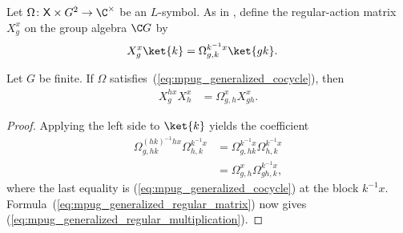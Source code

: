 \begin{definition}
    \label{def:mpug_generalized_regular_matrices}
    \leanok
    Let $\Omega\colon\mathsf X\times G^2\to\C^\times$ be an $L$-symbol.
    As in \cite[Lemma~\texttt{lemma:G\_cocycle}]{FrancoRubio2025MPUGauging},
    define the regular-action matrix $X^x_g$ on the group algebra $\C G$ by
    \begin{align}
        X^x_g\ket{k}
         & =\Omega^{k^{-1}x}_{g,k}\ket{gk}.
        \label{eq:mpug_generalized_regular_matrix}
    \end{align}
\end{definition}

\begin{lemma}
    \label{thm:mpug_generalized_regular_multiplication}
    \leanok
    Let $G$ be finite. If $\Omega$
    satisfies~(\ref{eq:mpug_generalized_cocycle}), then
    \begin{align}
        X^{h x}_gX^x_h
         & =\Omega^x_{g,h}X^x_{gh}.
        \label{eq:mpug_generalized_regular_multiplication}
    \end{align}
\end{lemma}

\begin{proof}\leanok
    Applying the left side to $\ket{k}$ yields the coefficient
    \begin{align}
        \Omega^{(hk)^{-1}h x}_{g,hk}\Omega^{k^{-1}x}_{h,k}
         & =\Omega^{k^{-1}x}_{g,hk}\Omega^{k^{-1}x}_{h,k} \\
         & =\Omega^x_{g,h}\Omega^{k^{-1}x}_{gh,k},
    \end{align}
    where the last equality is
    (\ref{eq:mpug_generalized_cocycle}) at the block $k^{-1}x$.
    Formula~(\ref{eq:mpug_generalized_regular_matrix}) now gives
    (\ref{eq:mpug_generalized_regular_multiplication}).
\end{proof}

